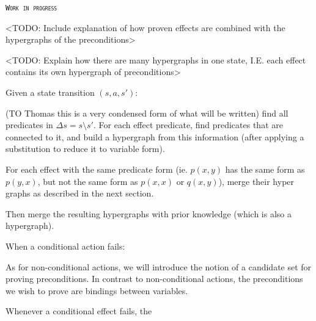 \documentclass[../Master.tex]{subfiles}
\begin{document}
\textsc{\texttt{Work in progress}}

<TODO: Include explanation of how proven effects are combined with the hypergraphs of the preconditions>

<TODO: Explain how there are many hypergraphs in one state, I.E. each effect contains its own hypergraph of preconditions>

Given a state transition $(s,a,s')$:

(TO Thomas this is a very condensed form of what will be written)
find all predicates in $\Delta s = s \setminus s'$. For each effect predicate, find predicates that are connected to it, and build a hypergraph from this information (after applying a substitution to reduce it to variable form). 

For each effect with the same predicate form (ie. $p(x,y)$ has the same form as $p(y,x)$, but not the same form as $p(x,x)$ or $q(x,y)$), merge their hyper graphs as described in the next section. 

Then merge the resulting hypergraphs with prior knowledge (which is also a hypergraph).

When a conditional action fails:

As for non-conditional actions, we will introduce the notion of a candidate set for proving preconditions. In contrast to non-conditional actions, the preconditions we wish to prove are bindings between variables. 

Whenever a conditional effect fails, the 
\end{document}

